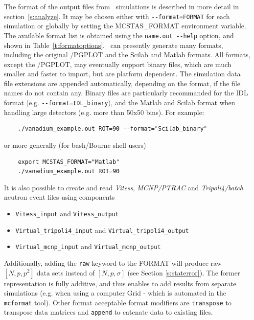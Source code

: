 The format of the output files from \MCS\ simulations is described in
more detail in section~\ref{s:analyze}. It may be chosen either with \verb+--format=FORMAT+ for each simulation or globally by setting the MCSTAS\_FORMAT environment variable. 
The available format list is obtained using the \verb+name.out --help+ option, and shown in Table~\ref{t:formatoptions}.      
\MCS\ can presently generate many formats, including the original \MCS /PGPLOT and the Scilab and Matlab formats. All formats, except the \MCS /PGPLOT, may eventually support binary files, which are much smaller and faster to import, but are platform dependent. The simulation data file extensions are appended automatically, depending on the format, if the file names do not contain any. Binary files are particularly recommanded for the IDL format (e.g. \verb+--format=IDL_binary+), and the Matlab and Scilab format when handling large detectors (e.g. more than 50x50 bins). For example:
\begin{verbatim}
    ./vanadium_example.out ROT=90 --format="Scilab_binary"
\end{verbatim}
or more generally (for bash/Bourne shell users)
\begin{verbatim}
    export MCSTAS_FORMAT="Matlab"
    ./vanadium_example.out ROT=90
\end{verbatim}

It is also possible to create and read \textit{Vitess}, \textit{MCNP/PTRAC} and \textit{Tripoli4/batch}
neutron event files using components
\begin{itemize}
\item \verb+Vitess_input+ and \verb+Vitess_output+
\item \verb+Virtual_tripoli4_input+ and \verb+Virtual_tripoli4_output+
\item \verb+Virtual_mcnp_input+ and \verb+Virtual_mcnp_output+
\end{itemize}  

Additionally, adding the \texttt{raw} keyword to the FORMAT will produce raw $[N, p, p^2]$ data sets instead of $[N, p, \sigma]$ (see Section \ref{s:staterror}). The former representation is fully additive, and thus enables to add results from separate simulations (e.g. when using a computer Grid - which is automated in the \verb+mcformat+ tool). Other format acceptable format modifiers are \verb+transpose+ to transpose data matrices and \verb+append+ to catenate data to existing files.


